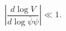 \begin{equation}\label{eq:slow-roll}
  \left|\frac{d\log V}{d\log \bar{\psi}\psi}\right|\ll 1.
\end{equation}

